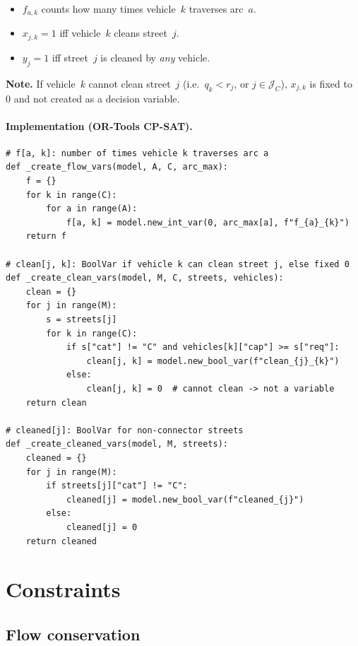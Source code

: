 \documentclass[11pt]{article}
\newcommand{\Jc}{\mathcal{J}_C}   %
\begin{document}
\begin{itemize}[nosep]
  \item $f_{a,k}$ counts how many times vehicle~$k$ traverses arc~$a$.
  \item $x_{j,k} = 1$ iff vehicle~$k$ cleans street~$j$.
  \item $y_j = 1$ iff street~$j$ is cleaned by \emph{any} vehicle.
\end{itemize}

\medskip\noindent
\textbf{Note.}
If vehicle~$k$ cannot clean street~$j$ (i.e.\ $q_k < r_j$, or $j \in \Jc$),
$x_{j,k}$ is fixed to~$0$ and not created as a decision variable.

\paragraph{Implementation (OR-Tools CP-SAT).}
\begin{lstlisting}[caption={Decision variable creation (\texttt{clipp/model.py})}]
# f[a, k]: number of times vehicle k traverses arc a
def _create_flow_vars(model, A, C, arc_max):
    f = {}
    for k in range(C):
        for a in range(A):
            f[a, k] = model.new_int_var(0, arc_max[a], f"f_{a}_{k}")
    return f

# clean[j, k]: BoolVar if vehicle k can clean street j, else fixed 0
def _create_clean_vars(model, M, C, streets, vehicles):
    clean = {}
    for j in range(M):
        s = streets[j]
        for k in range(C):
            if s["cat"] != "C" and vehicles[k]["cap"] >= s["req"]:
                clean[j, k] = model.new_bool_var(f"clean_{j}_{k}")
            else:
                clean[j, k] = 0  # cannot clean -> not a variable
    return clean

# cleaned[j]: BoolVar for non-connector streets
def _create_cleaned_vars(model, M, streets):
    cleaned = {}
    for j in range(M):
        if streets[j]["cat"] != "C":
            cleaned[j] = model.new_bool_var(f"cleaned_{j}")
        else:
            cleaned[j] = 0
    return cleaned
\end{lstlisting}

\section{Constraints}

\subsection{Flow conservation}
\end{document}
